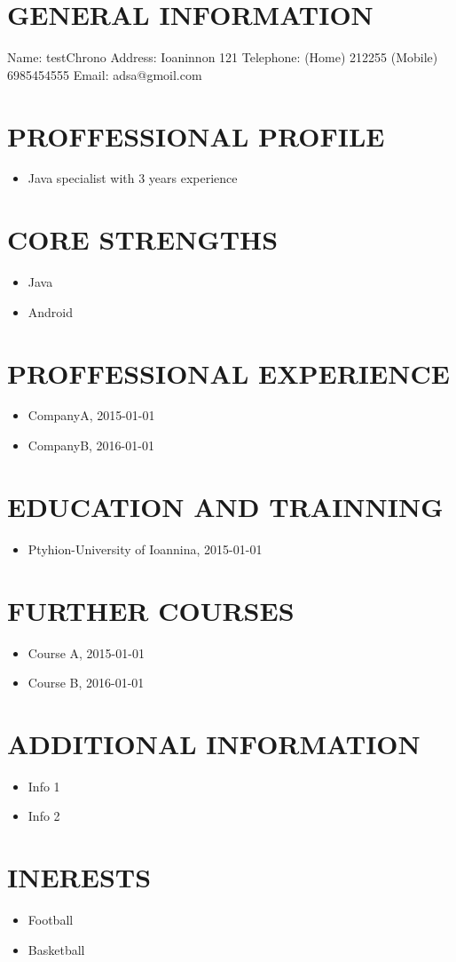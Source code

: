 \documentclass{article}
\begin{document}
 
\section{GENERAL INFORMATION}
Name: testChrono
Address: Ioaninnon 121
Telephone: (Home) 212255 (Mobile) 6985454555
Email: adsa@gmoil.com
\section{PROFFESSIONAL PROFILE}
\begin{itemize}
\item Java specialist with 3 years experience
\end{itemize}
\section{CORE STRENGTHS}
\begin{itemize}
\item Java
\item Android
\end{itemize}
\section{PROFFESSIONAL EXPERIENCE}
\begin{itemize}
\item CompanyA, 2015-01-01
\item CompanyB, 2016-01-01
\end{itemize}
\section{EDUCATION AND TRAINNING}
\begin{itemize}
\item Ptyhion-University of Ioannina, 2015-01-01
\end{itemize}
\section{FURTHER COURSES}
\begin{itemize}
\item Course A, 2015-01-01
\item Course B, 2016-01-01
\end{itemize}
\section{ADDITIONAL INFORMATION}
\begin{itemize}
\item Info 1
\item Info 2
\end{itemize}
\section{INERESTS}
\begin{itemize}
\item Football
\item Basketball
\end{itemize}
\end{document}
